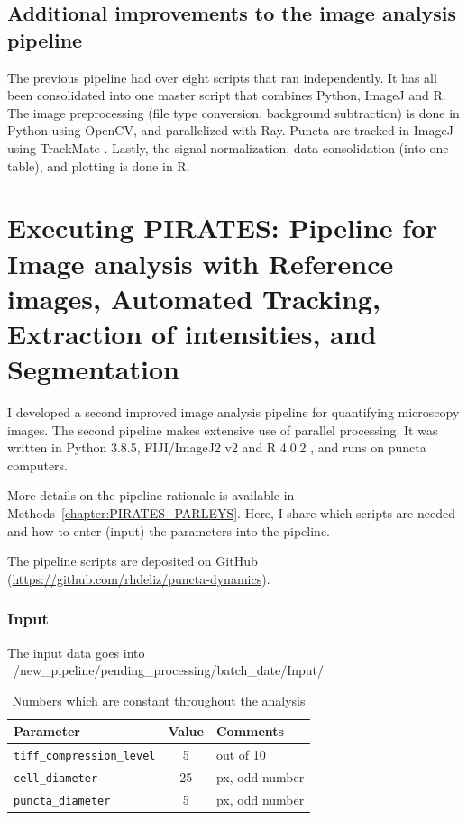 \subsection{Additional improvements to the image analysis pipeline}
The previous pipeline had over eight scripts that ran independently. It has all been consolidated into one master script that combines Python, ImageJ and R. The image preprocessing (file type conversion, background subtraction) is done in Python using OpenCV, and parallelized with Ray. Puncta are tracked in ImageJ using TrackMate \autocite{Tinevez_2017}. Lastly, the signal normalization, data consolidation (into one table), and plotting is done in R.

\section{Executing PIRATES: Pipeline for Image analysis with Reference images, Automated Tracking, Extraction of intensities, and Segmentation}
\label{section:PIRATES}
I developed a second improved image analysis pipeline for quantifying microscopy images. The second pipeline makes extensive use of parallel processing. It was written in Python 3.8.5, FIJI/ImageJ2 v2 \autocite{Schindelin_2012}\autocite{Rueden_2017} and R 4.0.2 \autocite{RCoreTeam_2020}, and runs on puncta computers.

More details on the pipeline rationale is available in Methods~\ref{chapter:PIRATES_PARLEYS}. Here, I share which scripts are needed and how to enter (input) the parameters into the pipeline.

The pipeline scripts are deposited on GitHub (\url{https://github.com/rhdeliz/puncta-dynamics}). 

\subsubsection*{Input}
The input data goes into ~/new\_pipeline/pending\_processing/batch\_date/Input/

\begin{table}[htb]
  \centering
  \caption{Numbers which are constant throughout the analysis}
  \label{tab:constants}
  \begin{tabular}{ | l | c | p{5cm} | }
    \hline
    \textbf{Parameter} & \textbf{Value} & \textbf{Comments} \\ \hline
    \texttt{tiff\_compression\_level} & 5 & out of 10 \\ \hline
    \texttt{cell\_diameter} & 25 & px, odd number \\ \hline
    \texttt{puncta\_diameter} & 5 & px, odd number \\ \hline
  \end{tabular}
\end{table}

